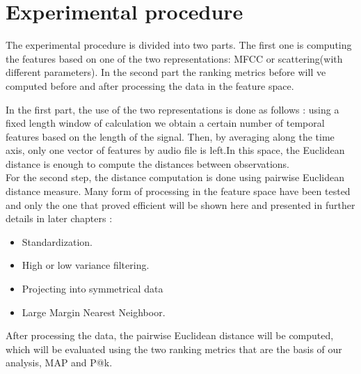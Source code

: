 \documentclass[hidelinks,12pt]{report}
\begin{document}
\section{Experimental procedure}
The experimental procedure is divided into two parts. The first one is computing the features based on one of the two representations: MFCC or scattering(with different parameters). In the second part the ranking metrics before will ve computed before and after processing the data in the feature space.\par
In the first part, the use of the two representations is done as follows : using a fixed length window of calculation we obtain a certain number of temporal features based on the length of the signal. Then, by averaging along the time axis, only one vector of features by audio file is left.In this space, the Euclidean distance is enough to compute the distances between observations.\\ 
For the second step, the distance computation is done using pairwise Euclidean distance measure. Many form of processing in the feature space have been tested and only the one that proved efficient will be shown here and presented in further details in later chapters :
\begin{itemize}
\item Standardization.
\item High or low variance filtering.
\item Projecting into symmetrical data
\item Large Margin Nearest Neighboor.\cite{W09}\\
\end{itemize}

After processing the data, the pairwise Euclidean distance will be computed, which will be evaluated using the two ranking metrics that are the basis of our analysis, MAP and P@k.
\end{document}
